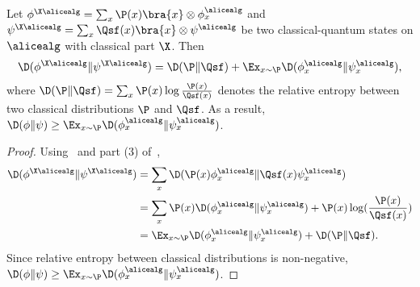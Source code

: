 \begin{proposition}\label{prop:divergence_chain_rule}
	Let $\phi^{\X \alicealg}= \sum_{x} \P(x)\bra{x} \otimes \phi_x^\alicealg$ and $\psi^{\X \alicealg}= \sum_{x} \Qsf(x) \bra{x} \otimes \psi^\alicealg$ be two classical-quantum states on $\alicealg$ with classical part $\X$. Then
	\begin{equation*}
		\D(\phi^{\X \alicealg} \| \psi^{\X \alicealg}) = \D(\P \| \Qsf) + \Ex_{x \sim \P} \D(\phi_x^{\alicealg} \| \psi^{\alicealg}_x ),
	\end{equation*}
	where $\D(\P \| \Qsf) = \sum_x \P(x) \log \frac{\P(x)}{\Qsf(x)}$ denotes the relative entropy between two classical distributions $\P$ and $\Qsf$. As a result, $\D(\phi \| \psi) \geq \Ex_{x \sim \P} \D(\phi_x^{\alicealg} \| \psi_x^{\alicealg})$.
\end{proposition}
\begin{proof}
	Using~ and part (3) of~,
	\begin{align*}
		\D(\phi^{\X \alicealg} \| \psi^{\X \alicealg}) &= \sum_{x} \D( \P(x)\phi_x^\alicealg \| \Qsf(x) \psi_x^\alicealg)  \\
		&= \sum_{x} \P(x) \D( \phi_x^\alicealg \| \psi_x^\alicealg)  + \P(x) \log(\frac{\P(x)}{\Qsf(x)})\\
		&= \Ex_{x \sim \P} \D(\phi_x^{\alicealg} \| \psi_x^{\alicealg} ) + \D(\P \| \Qsf).
	\end{align*}
	Since relative entropy between classical distributions is non-negative, $\D(\phi \| \psi) \geq \Ex_{x \sim \P} \D(\phi_x^{\alicealg} \| \psi_x^{\alicealg})$.
\end{proof}


